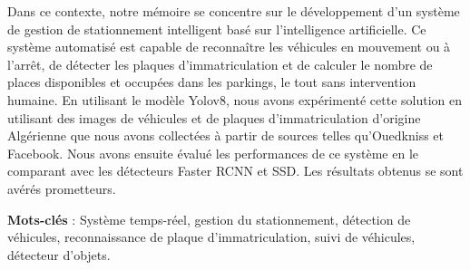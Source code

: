 \par

Dans ce contexte, notre mémoire se concentre sur le développement d'un système de gestion de stationnement intelligent basé sur l'intelligence artificielle. Ce système automatisé est capable de reconnaître les véhicules en mouvement ou à l'arrêt, de détecter les plaques d'immatriculation et de calculer le nombre de places disponibles et occupées dans les parkings, le tout sans intervention humaine. En utilisant le modèle Yolov8, nous avons expérimenté cette solution en utilisant des images de véhicules et de plaques d'immatriculation d'origine Algérienne que nous avons collectées à partir de sources telles qu'Ouedkniss et Facebook. Nous avons ensuite évalué les performances de ce système en le comparant avec les détecteurs Faster RCNN et SSD. Les résultats obtenus se sont avérés prometteurs.

\par \textbf{Mots-clés} : Système temps-réel, gestion du stationnement, détection de véhicules, reconnaissance de plaque d'immatriculation, suivi de véhicules, détecteur d'objets.


